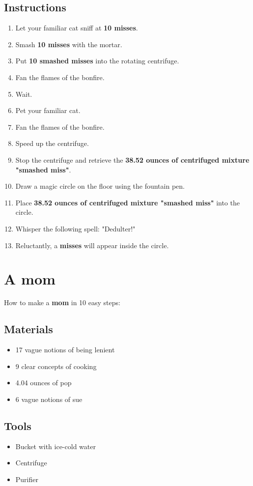 \documentclass{article}
\begin{document}
\subsection{Instructions}\begin{enumerate}
\item 
Let your familiar cat sniff at \textbf{10 misses}.
\item 
Smash \textbf{10 misses} with the mortar.
\item 
Put \textbf{10 smashed misses} into the rotating centrifuge.
\item 
Fan the flames of the bonfire.
\item 
Wait.
\item 
Pet your familiar cat.
\item 
Fan the flames of the bonfire.
\item 
Speed up the centrifuge.
\item 
Stop the centrifuge and retrieve the \textbf{38.52 ounces of centrifuged mixture "smashed miss"}.
\item 
Draw a magic circle on the floor using the fountain pen.
\item 
Place \textbf{38.52 ounces of centrifuged mixture "smashed miss"} into the circle.
\item 
Whisper the following spell: "Dedulter!"
\item 
Reluctantly, a \textbf{misses} will appear inside the circle.
\end{enumerate}
\newpage
\section{A mom}How to make a \textbf{mom} in 10 easy steps:

\subsection{Materials}\begin{itemize}
\item 
17 vague notions of being lenient
\item 
9 clear concepts of cooking
\item 
4.04 ounces of pop
\item 
6 vague notions of sue
\end{itemize}
\subsection{Tools}\begin{itemize}
\item 
Bucket with ice-cold water
\item 
Centrifuge
\item 
Purifier
\end{itemize}
\end{document}
